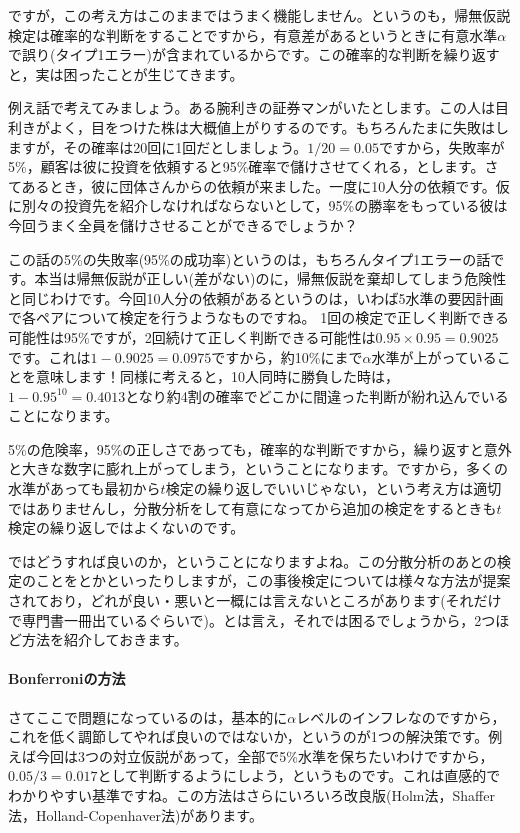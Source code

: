 \documentclass{ltjsarticle}
\begin{document}
ですが，この考え方はこのままではうまく機能しません。というのも，帰無仮説検定は確率的な判断をすることですから，有意差があるというときに有意水準$\alpha$で誤り(タイプ1エラー)が含まれているからです。この確率的な判断を繰り返すと，実は困ったことが生じてきます。

例え話で考えてみましょう。ある腕利きの証券マンがいたとします。この人は目利きがよく，目をつけた株は大概値上がりするのです。もちろんたまに失敗はしますが，その確率は20回に1回だとしましょう。$1/20=0.05$ですから，失敗率が5\%，顧客は彼に投資を依頼すると95\%確率で儲けさせてくれる，とします。さてあるとき，彼に団体さんからの依頼が来ました。一度に10人分の依頼です。仮に別々の投資先を紹介しなければならないとして，95\%の勝率をもっている彼は今回うまく全員を儲けさせることができるでしょうか？ 

この話の5\%の失敗率(95\%の成功率)というのは，もちろんタイプ1エラーの話です。本当は帰無仮説が正しい(差がない)のに，帰無仮説を棄却してしまう危険性と同じわけです。今回10人分の依頼があるというのは，いわば5水準の要因計画で各ペアについて検定を行うようなものですね。
1回の検定で正しく判断できる可能性は95\%ですが，2回続けて正しく判断できる可能性は$0.95\times0.95=0.9025$です。これは$1-0.9025=0.0975$ですから，約10\%にまで$\alpha$水準が上がっていることを意味します！同様に考えると，10人同時に勝負した時は，$1-0.95^{10}=0.4013$となり約4割の確率でどこかに間違った判断が紛れ込んでいることになります。

5\%の危険率，95\%の正しさであっても，確率的な判断ですから，繰り返すと意外と大きな数字に膨れ上がってしまう，ということになります。ですから，多くの水準があっても最初から$t$検定の繰り返しでいいじゃない，という考え方は適切ではありませんし，分散分析をして有意になってから追加の検定をするときも$t$検定の繰り返しではよくないのです。

ではどうすれば良いのか，ということになりますよね。この分散分析のあとの検定のことをとかといったりしますが，この事後検定については様々な方法が提案されており，どれが良い・悪いと一概には言えないところがあります(それだけで専門書一冊出ているぐらいで\citep{BA33892274})。とは言え，それでは困るでしょうから，2つほど方法を紹介しておきます。

\paragraph{Bonferroniの方法}さてここで問題になっているのは，基本的に$\alpha$レベルのインフレなのですから，これを低く調節してやれば良いのではないか，というのが1つの解決策です。例えば今回は3つの対立仮説があって，全部で5\%水準を保ちたいわけですから，$0.05/3=0.017$として判断するようにしよう，というものです。これは直感的でわかりやすい基準ですね。この方法はさらにいろいろ改良版(Holm法，Shaffer	法，Holland-Copenhaver法)があります。
\end{document}
